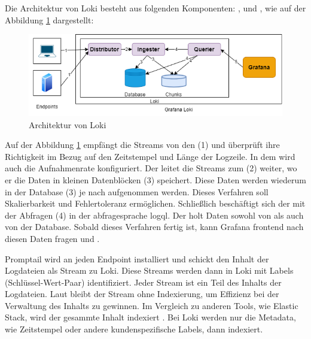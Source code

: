 Die Architektur von Loki besteht aus folgenden Komponenten: ,  und , wie auf der Abbildung
\ref{fig:Loki-Architektur} dargestellt:

\begin{figure}[H]
   \centering
   \includegraphics[width=1\textwidth]{assets/LokiArchitektur.drawio.png}
   \caption[Architektur von Loki]
   {Architektur von Loki \cite{Grafana_LokiArchitektur2}}
   \label{fig:Loki-Architektur}
   \centering
 \end{figure}
 
Auf der Abbildung \ref{fig:Loki-Architektur} empfängt   die Streams von den (1)  und überprüft ihre Richtigkeit im Bezug auf den Zeitstempel und Länge der Logzeile. In dem  wird auch die Aufnahmenrate konfiguriert. Der  leitet die Streams zum (2)  weiter, wo er die Daten in kleinen Datenblöcken (3) speichert. Diese Daten werden wiederum in der Database (3) je nach  aufgenommen werden. Dieses Verfahren soll Skalierbarkeit und Fehlertoleranz ermöglichen. Schließlich beschäftigt sich der  mit der Abfragen (4) in der \gls{abfragesprache} \gls{logql}. Der  holt Daten sowohl von  als auch von der Database. Sobald dieses Verfahren fertig ist, kann Grafana \gls{frontend} nach diesen Daten fragen \citep{Grafana_LokiArchitektur} und \citep{Grafana_LokiArchitektur2}.

Promptail wird an jeden \gls{Endpoint} installiert und schickt den Inhalt der Logdateien als Stream zu Loki. Diese Streams werden dann in Loki mit Labels (Schlüssel-Wert-Paar) identifiziert. Jeder Stream ist ein Teil des Inhalts der Logdateien. Laut \cite{Grafana_fundamentals} bleibt der Stream ohne Indexierung, um Effizienz bei der Verwaltung des Inhalts zu gewinnen. Im Vergleich zu anderen Tools, wie Elastic Stack, wird der gesammte Inhalt indexiert \citep{Anand_LokixELK}. Bei Loki werden nur die Metadata, wie Zeitstempel oder andere kundenspezifische Labels, dann indexiert.

